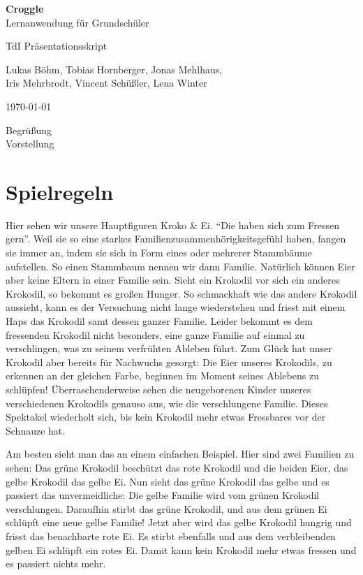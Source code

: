 \documentclass{scrartcl}
\begin{document}
	\begin{titlepage}
		\begin{center}
			{\huge \bfseries Croggle}\\[0.1cm]
			{\large  Lernanwendung für Grundschüler}
		\end{center}


		\begin{center}
			{\Large TdI Präsentationsskript}\\[0.5cm]
		\end{center}
		\begin{center}
			{Lukas Böhm, Tobias Hornberger, Jonas Mehlhaus, \\ Iris Mehrbrodt, Vincent Schüßler, Lena Winter} \\[1cm]
		\end{center}

		\begin{center}
			{\large \today}
		\end{center}
	\end{titlepage}

	Begrüßung\\
	Vorstellung
	\section{Spielregeln}
	Hier sehen wir unsere Hauptfiguren Kroko \& Ei.
	"`Die haben sich zum Fressen gern"'.
	Weil sie so eine starkes Familienzusammenhörigkeitsgefühl haben, fangen sie immer an, indem sie sich in Form eines oder mehrerer Stammbäume aufstellen.
	So einen Stammbaum nennen wir dann Familie.
	Natürlich können Eier aber keine Eltern in einer Familie sein.
	Sieht ein Krokodil vor sich ein anderes Krokodil, so bekommt es großen Hunger. So schmackhaft wie das andere Krokodil aussieht, kann es der Versuchung nicht lange wiederstehen und frisst mit einem Haps das Krokodil samt dessen ganzer Familie.
	Leider bekommt es dem fressenden Krokodil nicht besonders, eine ganze Familie auf einmal zu verschlingen, was zu seinem verfrühten Ableben führt.
	Zum Glück hat unser Krokodil aber bereits für Nachwuchs gesorgt: Die Eier unseres Krokodils, zu erkennen an der gleichen Farbe, beginnen im Moment seines Ablebens zu schlüpfen!
	Überraschenderweise sehen die neugeborenen Kinder unseres verschiedenen Krokodils genauso aus, wie die verschlungene Familie.
	Dieses Spektakel wiederholt sich, bis kein Krokodil mehr etwas Fressbares vor der Schnauze hat.

	Am besten sieht man das an einem einfachen Beispiel.
	Hier sind zwei Familien zu sehen: Das grüne Krokodil beschützt das rote Krokodil und die beiden Eier, das gelbe Krokodil das gelbe Ei.
	Nun sieht das grüne Krokodil das gelbe und es passiert das unvermeidliche: Die gelbe Familie wird vom grünen Krokodil verschlungen.
	Daraufhin stirbt das grüne Krokodil, und aus dem grünen Ei schlüpft eine neue gelbe Familie!
	Jetzt aber wird das gelbe Krokodil hungrig und frisst das benachbarte rote Ei.
	Es stirbt ebenfalls und aus dem verbleibenden gelben Ei schlüpft ein rotes Ei.
	Damit kann kein Krokodil mehr etwas fressen und es passiert nichts mehr.
\end{document}
